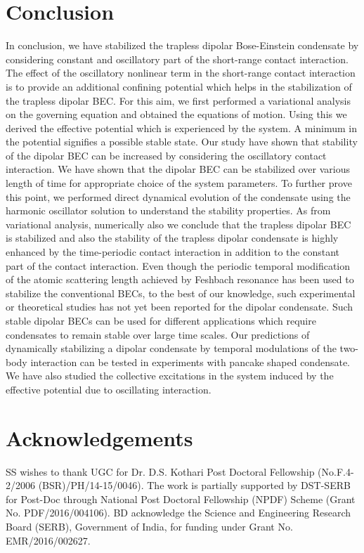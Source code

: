 \documentclass[amsmath,amssymb,article,twocolumn,superscriptaddress,showpacs,10pt]{revtex4-1}
\begin{document}
\section{Conclusion} \label{sec6}
In conclusion, we have stabilized the trapless dipolar Bose-Einstein condensate by considering constant and oscillatory part of the short-range contact interaction. The effect of the oscillatory nonlinear term in the short-range contact interaction is to provide an additional confining potential which helps in the stabilization of the trapless dipolar BEC. For this aim, we first performed a variational analysis on the governing equation and obtained the equations of motion. Using this we derived the effective potential which is experienced by the system. A minimum in the potential signifies a possible stable state. Our study have shown that stability of the dipolar BEC can be increased by considering the oscillatory contact interaction. We have shown that the dipolar BEC can be stabilized over various length of time for appropriate choice of the system parameters. To further prove this point, we performed direct dynamical evolution of the condensate using the harmonic oscillator solution to understand the stability properties. As from variational analysis, numerically also we conclude that the trapless dipolar BEC is stabilized and also the stability of the trapless dipolar condensate is highly enhanced by the time-periodic contact interaction in addition to the constant part of the contact interaction. Even though the periodic temporal modification of the atomic scattering length achieved by Feshbach resonance has been used to stabilize the conventional BECs, to the best of our knowledge, such experimental or theoretical studies has not yet been reported for the dipolar condensate. Such stable dipolar BECs can be used for different applications which require condensates to remain stable over large time scales. Our predictions of dynamically stabilizing a dipolar condensate by temporal modulations of the two-body interaction can be tested in experiments with pancake shaped condensate. We have also studied the collective excitations in the system induced by the effective potential due to oscillating interaction. 

\section*{Acknowledgements}
\noindent SS wishes to thank UGC for Dr. D.S. Kothari Post Doctoral Fellowship (No.F.4-2/2006 (BSR)/PH/14-15/0046). The work is partially supported by DST-SERB for Post-Doc through National Post Doctoral Fellowship (NPDF) Scheme (Grant No. PDF/2016/004106). BD acknowledge the Science and Engineering Research Board (SERB), Government of India, for funding under Grant No. EMR/2016/002627.
\end{document}
